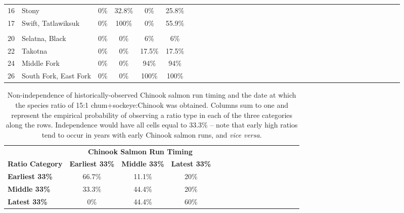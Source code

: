 \documentclass[12pt,]{book}
\theoremstyle{definition}
\theoremstyle{definition}
\theoremstyle{definition}
\theoremstyle{remark}
\begin{document}
\begin{longtable}[t]{clccccclccccclccccclccccclccccclcccc}
\hspace{1em}16 & Stony & 0\% & 32.8\% & 0\% & 25.8\%\\
\hspace{1em}17 & Swift, Tatlawiksuk & 0\% & 100\% & 0\% & 55.9\%\\
\addlinespace[0.3em]
\hline
\multicolumn{36}{l}{\textbf{Upper River}}\\
\hline
\hspace{1em}20 & Selatna, Black & 0\% & 0\% & 6\% & 6\%\\
\hspace{1em}22 & Takotna & 0\% & 0\% & 17.5\% & 17.5\%\\
\hspace{1em}24 & Middle Fork & 0\% & 0\% & 94\% & 94\%\\
\hspace{1em}26 & South Fork, East Fork & 0\% & 0\% & 100\% & 100\%\\
\bottomrule
\end{longtable}

\clearpage

\begin{table}

\caption{\label{tab:ratio-timing-cov-table}Non-independence of historically-observed Chinook salmon run timing and the date at which the species ratio of 15:1 chum+sockeye:Chinook was obtained. Columns sum to one and represent the empirical probability of observing a ratio type in each of the three categories along the rows. Independence would have all cells equal to 33.3\% -- note that early high ratios tend to occur in years with early Chinook salmon runs, and \textit{vice versa}.}
\centering
\begin{tabular}[t]{>{\bfseries}lccclccclccclccc}
\toprule
\multicolumn{1}{c}{\bfseries } & \multicolumn{3}{c}{\bfseries Chinook Salmon Run Timing} \\
\cmidrule(l{2pt}r{2pt}){2-4}
\textbf{Ratio Category} & \textbf{Earliest 33\%} & \textbf{Middle 33\%} & \textbf{Latest 33\%}\\
\midrule
Earliest 33\% & 66.7\% & 11.1\% & 20\%\\
Middle 33\% & 33.3\% & 44.4\% & 20\%\\
Latest 33\% & 0\% & 44.4\% & 60\%\\
\bottomrule
\end{tabular}
\end{table}

\clearpage
\end{document}
